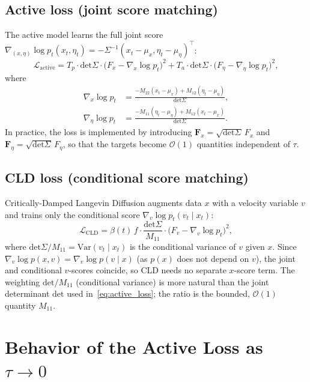 \documentclass[11pt]{article}
\newcommand{\Tp}{T_p}
\newcommand{\Ta}{T_a}
\newcommand{\tauu}{\tau}
\renewcommand{\det}{\mathrm{det}}
\begin{document}
\subsection{Active loss (joint score matching)}
The active model learns the full joint score
$\nabla_{(x,\eta)}\log p_t(x_t,\eta_t) = -\Sigma^{-1}(x_t - \mu_x, \eta_t - \mu_\eta)^\top$:
\begin{equation}
\mathcal{L}_{\text{active}} =
\Tp \cdot \det\Sigma \cdot \bigl(F_x - \nabla_x \log p_t\bigr)^2
+\Ta \cdot \det\Sigma \cdot \bigl(F_\eta - \nabla_\eta \log p_t\bigr)^2,
\label{eq:active_loss}
\end{equation}
where
\begin{align}
\nabla_x \log p_t &= \frac{-M_{22}(x_t - \mu_x) + M_{12}(\eta_t - \mu_\eta)}{\det\Sigma},
\label{eq:x_score}\\
\nabla_\eta \log p_t &= \frac{-M_{11}(\eta_t - \mu_\eta) + M_{12}(x_t - \mu_x)}{\det\Sigma}.
\label{eq:eta_score}
\end{align}
In practice, the loss is implemented by introducing
$\mathbf{F}_x = \sqrt{\det\Sigma}\,F_x$ and $\mathbf{F}_\eta = \sqrt{\det\Sigma}\,F_\eta$,
so that the targets become $\mathcal{O}(1)$ quantities independent of $\tauu$.

\subsection{CLD loss (conditional score matching)}

Critically-Damped Langevin Diffusion \cite{dockhorn2022cld} augments data $x$ with a
velocity variable $v$ and trains only the conditional score $\nabla_v \log p_t(v_t\mid x_t)$:
\begin{equation}
\mathcal{L}_{\text{CLD}} = \beta(t)\,f \cdot \frac{\det\Sigma}{M_{11}} \cdot
\bigl(F_v - \nabla_v \log p_t\bigr)^2,
\end{equation}
where $\det\Sigma/M_{11} = \mathrm{Var}(v_t\mid x_t)$ is the conditional variance of $v$
given $x$.  Since $\nabla_v \log p(x,v) = \nabla_v \log p(v\mid x)$ (as $p(x)$ does not
depend on $v$), the joint and conditional $v$-scores coincide, so CLD needs no separate
$x$-score term.  The weighting $\det/M_{11}$ (conditional variance) is more natural than
the joint determinant $\det$ used in~\eqref{eq:active_loss}; the ratio is the
bounded, $\mathcal{O}(1)$ quantity $M_{11}$.

\section{Behavior of the Active Loss as $\tauu\to 0$}
\end{document}
